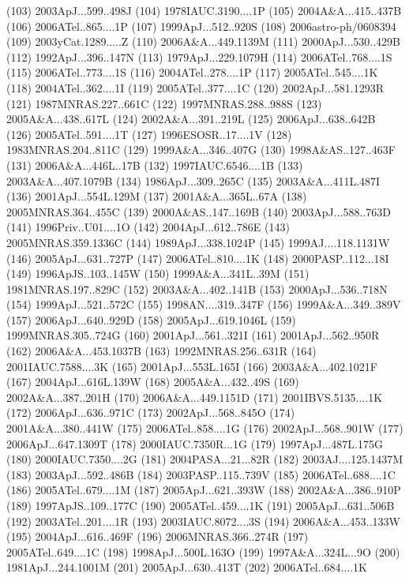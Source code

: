 (103) 2003ApJ...599..498J
(104) 1978IAUC.3190....1P
(105) 2004A\&A...415..437B
(106) 2006ATel..865....1P
(107) 1999ApJ...512..920S
(108) 2006astro-ph/0608394
(109) 2003yCat.1289.....Z
(110) 2006A\&A...449.1139M
(111) 2000ApJ...530..429B
(112) 1992ApJ...396..147N
(113) 1979ApJ...229.1079H
(114) 2006ATel..768....1S
(115) 2006ATel..773....1S
(116) 2004ATel..278....1P
(117) 2005ATel..545....1K
(118) 2004ATel..362....1I
(119) 2005ATel..377....1C
(120) 2002ApJ...581.1293R
(121) 1987MNRAS.227..661C
(122) 1997MNRAS.288..988S
(123) 2005A\&A...438..617L
(124) 2002A\&A...391..219L
(125) 2006ApJ...638..642B
(126) 2005ATel..591....1T
(127) 1996ESOSR..17....1V
(128) 1983MNRAS.204..811C
(129) 1999A\&A...346..407G
(130) 1998A\&AS..127..463F
(131) 2006A\&A...446L..17B
(132) 1997IAUC.6546....1B
(133) 2003A\&A...407.1079B
(134) 1986ApJ...309..265C
(135) 2003A\&A...411L.487I
(136) 2001ApJ...554L.129M
(137) 2001A\&A...365L..67A
(138) 2005MNRAS.364..455C
(139) 2000A\&AS..147..169B
(140) 2003ApJ...588..763D
(141) 1996Priv..U01....1O
(142) 2004ApJ...612..786E
(143) 2005MNRAS.359.1336C
(144) 1989ApJ...338.1024P
(145) 1999AJ....118.1131W
(146) 2005ApJ...631..727P
(147) 2006ATel..810....1K
(148) 2000PASP..112...18I
(149) 1996ApJS..103..145W
(150) 1999A\&A...341L..39M
(151) 1981MNRAS.197..829C
(152) 2003A\&A...402..141B
(153) 2000ApJ...536..718N
(154) 1999ApJ...521..572C
(155) 1998AN....319..347F
(156) 1999A\&A...349..389V
(157) 2006ApJ...640..929D
(158) 2005ApJ...619.1046L
(159) 1999MNRAS.305..724G
(160) 2001ApJ...561..321I
(161) 2001ApJ...562..950R
(162) 2006A\&A...453.1037B
(163) 1992MNRAS.256..631R
(164) 2001IAUC.7588....3K
(165) 2001ApJ...553L.165I
(166) 2003A\&A...402.1021F
(167) 2004ApJ...616L.139W
(168) 2005A\&A...432..49S
(169) 2002A\&A...387..201H
(170) 2006A\&A...449.1151D
(171) 2001IBVS.5135....1K
(172) 2006ApJ...636..971C
(173) 2002ApJ...568..845O
(174) 2001A\&A...380..441W
(175) 2006ATel..858....1G
(176) 2002ApJ...568..901W
(177) 2006ApJ...647.1309T
(178) 2000IAUC.7350R...1G
(179) 1997ApJ...487L.175G
(180) 2000IAUC.7350....2G
(181) 2004PASA...21...82R
(182) 2003AJ....125.1437M
(183) 2003ApJ...592..486B
(184) 2003PASP..115..739V
(185) 2006ATel..688....1C
(186) 2005ATel..679....1M
(187) 2005ApJ...621..393W
(188) 2002A\&A...386..910P
(189) 1997ApJS..109..177C
(190) 2005ATel..459....1K
(191) 2005ApJ...631..506B
(192) 2003ATel..201....1R
(193) 2003IAUC.8072....3S
(194) 2006A\&A...453..133W
(195) 2004ApJ...616..469F
(196) 2006MNRAS.366..274R
(197) 2005ATel..649....1C
(198) 1998ApJ...500L.163O
(199) 1997A\&A...324L...9O
(200) 1981ApJ...244.1001M
(201) 2005ApJ...630..413T
(202) 2006ATel..684....1K
